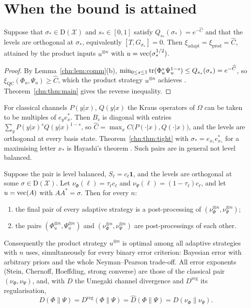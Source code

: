 \section{When the bound is attained}\label{chn:sec:attained}

\begin{theorem}\label{chn:thm:tight}
Suppose that $\sigma_*\in\mathrm D(\mathcal X)$ and $s_*\in[0,1]$ satisfy $Q_{s_*}(\sigma_*)=e^{-\widehat C}$ and that the levels are orthogonal at $\sigma_*$, equivalently $[T,G_{\sigma_*}]=0$. Then $\xi_{\mathrm{adapt}}=\xi_{\mathrm{prod}}=\widehat C$, attained by the product inputs $u^{\otimes n}$ with $u=\operatorname{vec}(\sigma_*^{1/2})$.
\end{theorem}

\begin{proof}
By Lemma~\ref{chn:lem:comm}(b), $\min_{0\le s\le1}\operatorname{tr}(\Phi_u^s\Psi_u^{1-s})\le Q_{s_*}(\sigma_*)=e^{-\widehat C}$, so $\xi_{\mathrm{QC}}(\Phi_u,\Psi_u)\ge\widehat C$, which the product strategy $u^{\otimes n}$ achieves \cite{AudenaertChernoff2007,NussbaumSzkola2009}. Theorem~\ref{chn:thm:main} gives the reverse inequality.
\end{proof}

\begin{remark}
For classical channels $P(y|x)$, $Q(y|x)$ the Kraus operators of $\Omega$ can be taken to be multiples of $e_ye_x^*$. Then $B_s$ is diagonal with entries $\sum_yP(y|x)^sQ(y|x)^{1-s}$, so $\widehat C=\max_xC\big(P(\cdot|x),Q(\cdot|x)\big)$, and the levels are orthogonal at every basis state. Theorem~\ref{chn:thm:tight} with $\sigma_*=e_{x_*}e_{x_*}^*$ for a maximising letter $x_*$ is Hayashi's theorem \cite{Hayashi2009}. Such pairs are in general not level balanced.
\end{remark}

\begin{theorem}\label{chn:thm:exact}
Suppose the pair is level balanced, $S_\ell=c_\ell\mathbf 1$, and the levels are orthogonal at some $\sigma\in\mathrm D(\mathcal X)$. Let $\nu_\Phi(\ell)=\tau_\ell c_\ell$ and $\nu_\Psi(\ell)=(1-\tau_\ell)c_\ell$, and let $u=\operatorname{vec}(A)$ with $AA^*=\sigma$. Then for every $n$:
\begin{enumerate}
\item[(a)] the final pair of every adaptive strategy is a post-processing of $(\nu_\Phi^{\otimes n},\nu_\Psi^{\otimes n})$;
\item[(b)] the pairs $(\Phi_u^{\otimes n},\Psi_u^{\otimes n})$ and $(\nu_\Phi^{\otimes n},\nu_\Psi^{\otimes n})$ are post-processings of each other.
\end{enumerate}
Consequently the product strategy $u^{\otimes n}$ is optimal among all adaptive strategies with $n$ uses, simultaneously for every binary error criterion: Bayesian error with arbitrary priors and the whole Neyman--Pearson trade-off. All error exponents (Stein, Chernoff, Hoeffding, strong converse) are those of the classical pair $(\nu_\Phi,\nu_\Psi)$, and, with $D$ the Umegaki channel divergence and $D^{\mathrm{reg}}$ its regularisation,
\[
D(\Phi\|\Psi)=D^{\mathrm{reg}}(\Phi\|\Psi)=\widehat D(\Phi\|\Psi)=D(\nu_\Phi\|\nu_\Psi).
\]
\end{theorem}

